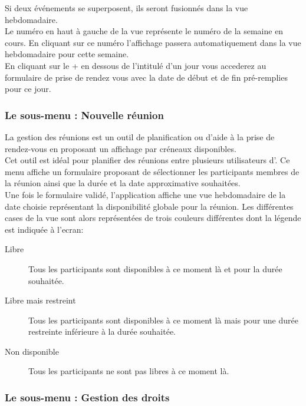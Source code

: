 Si deux événements se superposent, ils seront fusionnés dans la vue hebdomadaire.\\

Le numéro en haut à gauche de la vue représente le numéro de la semaine en cours.
En cliquant sur ce numéro l'affichage passera automatiquement dans
la vue hebdomadaire pour cette semaine.\\
En cliquant sur le + en dessous de l'intitulé d'un jour vous accederez au 
formulaire de prise de rendez vous avec la date de début et de fin 
pré-remplies pour ce jour.

\subsubsection{Le sous-menu : Nouvelle réunion}

La gestion des réunions est un outil de planification ou d'aide à la prise de rendez-vous en proposant un affichage par créneaux disponibles.\\

Cet outil est idéal pour planifier des réunions entre plusieurs utilisateurs
d'\obm.
Ce menu affiche un formulaire proposant de sélectionner les participants membres de la réunion ainsi que la durée et la date approximative souhaitées.\\

Une fois le formulaire validé, l'application affiche une vue hebdomadaire de la date
choisie représentant la disponibilité globale pour la réunion.
Les différentes cases de la vue sont alors représentées de trois couleurs différentes dont la légende est indiquée à l'ecran:
\begin{description}
\item[Libre] Tous les participants sont disponibles à ce moment là et pour la durée souhaitée.
\item[Libre mais restreint] Tous les participants sont disponibles à ce moment là mais  pour une durée restreinte inférieure à la durée souhaitée.
\item[Non disponible] Tous les participants ne sont pas libres à ce moment là.
\end{description}

\subsubsection{Le sous-menu : Gestion des droits}

